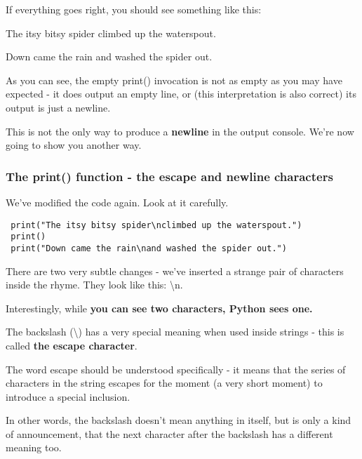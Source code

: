 \documentclass[a4paper,10pt]{article}
\begin{document}
If everything goes right, you should see something like this:
\newline

{\selectfont The itsy bitsy spider climbed up the waterspout.
\newline

Down came the rain and washed the spider out.}
\newline

As you can see, the empty {\selectfont print()} invocation is not as empty as you may have expected - it does output an empty line, or (this interpretation is also correct) its output is just a newline.
\newline

This is not the only way to produce a \textbf{newline} in the output console. We're now going to show you another way.

\subsubsection{The print() function - the escape and newline characters}
We've modified the code again. Look at it carefully.
\begin{verbatim}
 print("The itsy bitsy spider\nclimbed up the waterspout.")
 print()
 print("Down came the rain\nand washed the spider out.")
\end{verbatim}

There are two very subtle changes - we've inserted a strange pair of characters inside the rhyme. They look like this: {\selectfont \textbackslash n}.
\newline

Interestingly, while \textbf{you can see two characters, Python sees one.}
\newline

The backslash ({\selectfont \textbackslash }) has a very special meaning when used inside strings - this is called \textbf{the escape character}.
\newline

The word escape should be understood specifically - it means that the series of characters in the string escapes for the moment (a very short moment) to introduce a special inclusion.
\newline

In other words, the backslash doesn't mean anything in itself, but is only a kind of announcement, that the next character after the backslash has a different meaning too.
\newline
\end{document}
